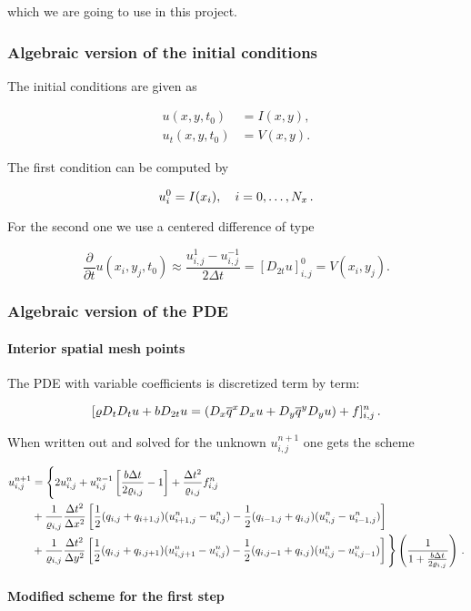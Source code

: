 \documentclass[letterpaper,10pt,english]{/usr/share/sphinx/texinputs/sphinxhowto}
\begin{document}
which we are going to use in this project.\subsubsection{Algebraic version of the initial conditions}

The initial conditions are given as

\begin{align*}
u(x,y,t_0)&=I(x,y),\\
u_t(x,y,t_0)&=V(x,y).
\end{align*}

The first condition can be computed by

\[
u_i^0 = I(x_i),\quad i=0,\ldots,N_x{\thinspace .}
\]

For the second one we use a centered difference of type

\[
\frac{\partial}{\partial t} u(x_i,y_j,t_0)\approx
\frac{u^1_{i,j} - u^{-1}_{i,j}}{2\Delta t} = [D_{2t} u]^0_{i,j} = V(x_i,y_j).
\]\subsubsection{Algebraic version of the PDE}

\paragraph{Interior spatial mesh points}

The PDE with variable coefficients is discretized term by term:

\[
[\varrho D_tD_t u + b D_{2t} u  = (D_x\overline{q}^x D_x u +
D_y\overline{q}^y D_yu ) + f]^n_{i,j}
\thinspace .
\]

When written out and solved for the unknown $u^{n+1}_{i,j}$ one gets the
scheme

\begin{align*}u^{n+1}_{i,j} &= 
\Bigg\{
2u^{n}_{i,j} + u^{n-1}_{i,j}\left[\frac{b \Delta t}{2\varrho_{i,j}} - 1\right]+\frac{\Delta t^2}{\varrho_{i,j}} f^n_{i,j} \\
&+ \frac{1}{\varrho_{i,j}}\frac{\Delta t^2}{\Delta x^2} 
\left[ \frac{1}{2}(q_{i,j} + q_{i+1,j})(u^{n}_{i+1,j} - u^{n}_{i,j}) - \frac{1}{2}(q_{i-1,j} + q_{i,j})(u^{n}_{i,j} - u^{n}_{i-1,j})\right] \\
&+ \frac{1}{\varrho_{i,j}}\frac{\Delta t^2}{\Delta y^2} 
\left[ \frac{1}{2}(q_{i,j} + q_{i,j+1})(u^{n}_{i,j+1} - u^{n}_{i,j}) -\frac{1}{2}(q_{i,j-1} + q_{i,j})(u^{n}_{i,j} - u^{n}_{i,j-1})\right]
\Bigg\} \left(\frac{1}{1+ \frac{b\Delta t}{2\varrho_{i,j} }}\right )
\thinspace .\end{align*}\paragraph{Modified scheme for the first step}
\end{document}
